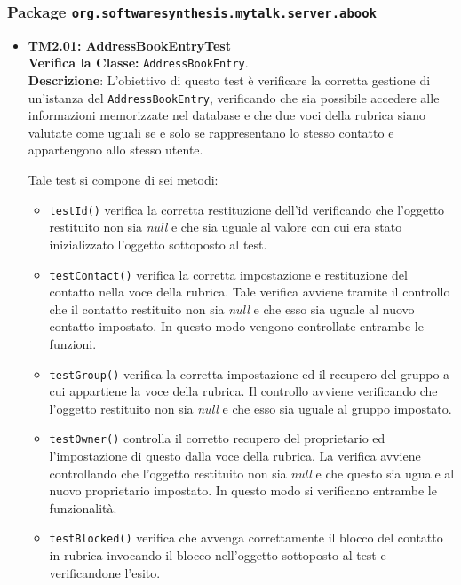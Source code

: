 \subsubsection{Package \texttt{org.softwaresynthesis.mytalk.server.abook}}
\begin{itemize}
\item[\passed] \textbf{TM2.01: AddressBookEntryTest}\\
\textbf{Verifica la Classe:} \texttt{AddressBookEntry}.\\
\textbf{Descrizione}: L'obiettivo di questo test è verificare la corretta gestione di un'istanza del  \texttt{AddressBookEntry}, verificando che sia possibile accedere alle informazioni memorizzate nel database e che due voci della rubrica siano valutate come uguali se e solo se rappresentano lo stesso contatto e appartengono allo stesso utente.

Tale test si compone di sei metodi:
\begin{itemize}

\item \texttt{testId()} verifica la corretta restituzione dell'id verificando che l'oggetto restituito non sia \textit{null} e che sia uguale al valore con cui era stato inizializzato l'oggetto sottoposto al test.

\item \texttt{testContact()} verifica la corretta impostazione e restituzione del contatto nella voce della rubrica. Tale verifica avviene tramite il controllo che il contatto restituito non sia \textit{null} e che esso sia uguale al nuovo contatto impostato. In questo modo vengono controllate entrambe le funzioni.

\item \texttt{testGroup()} verifica la corretta impostazione ed il recupero del gruppo a cui appartiene la voce della rubrica. Il controllo avviene verificando che l'oggetto restituito non sia \textit{null} e che esso sia uguale al gruppo impostato. 

\item \texttt{testOwner()} controlla il corretto recupero del proprietario ed l'impostazione di questo dalla voce della rubrica. La verifica avviene controllando che l'oggetto restituito non sia \textit{null} e che questo sia uguale al nuovo proprietario impostato. In questo modo si verificano entrambe le funzionalità.

\item \texttt{testBlocked()} verifica che avvenga correttamente il blocco del contatto in rubrica invocando il blocco nell'oggetto sottoposto al test e verificandone l'esito.


\end{itemize}
\end{itemize}
